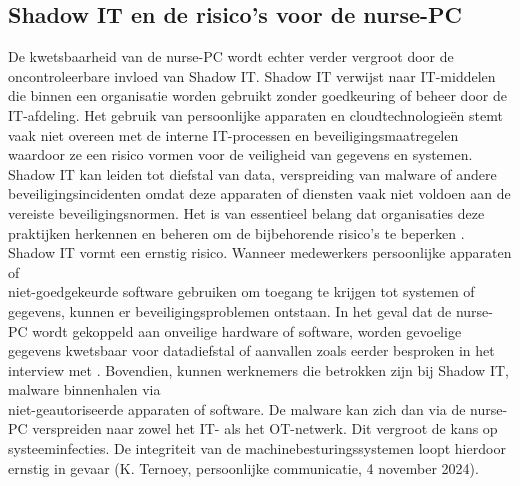 \subsection{Shadow IT en de risico's voor de nurse-PC}
De kwetsbaarheid van de nurse-PC wordt echter verder vergroot door de oncontroleerbare invloed van Shadow IT.
Shadow IT verwijst naar IT-middelen die binnen een organisatie worden gebruikt zonder goedkeuring of beheer door de IT-afdeling.
Het gebruik van persoonlijke apparaten en cloudtechnologieën stemt vaak niet overeen met de interne IT-processen en beveiligingsmaatregelen waardoor ze een 
risico vormen voor de veiligheid van gegevens en systemen. Shadow IT kan leiden tot diefstal van data, 
verspreiding van malware of andere beveiligingsincidenten omdat deze apparaten of diensten vaak niet voldoen aan de vereiste beveiligingsnormen. 
Het is van essentieel belang dat organisaties deze praktijken herkennen en beheren om de bijbehorende risico’s te beperken \autocite{NCSC2023}.
Shadow IT vormt een ernstig risico.
Wanneer medewerkers persoonlijke apparaten of 
\\niet-goedgekeurde software gebruiken om toegang te krijgen tot systemen of gegevens, kunnen er beveiligingsproblemen ontstaan. 
In het geval dat de nurse-PC wordt gekoppeld aan onveilige hardware of software, worden gevoelige gegevens kwetsbaar voor 
datadiefstal of aanvallen zoals eerder besproken in het interview met \textcite{Hecker2021}. 
Bovendien, kunnen werknemers die betrokken zijn bij Shadow IT, malware binnenhalen via \\ niet-geautoriseerde apparaten of software. 
De malware kan zich dan via de nurse-PC verspreiden naar zowel het IT- als het OT-netwerk. 
Dit vergroot de kans op systeeminfecties. De integriteit van de machinebesturingssystemen loopt hierdoor ernstig in
gevaar (K. Ternoey, persoonlijke communicatie, 4 november 2024).

